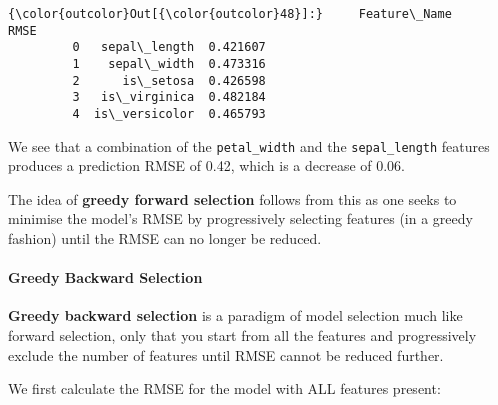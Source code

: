 \documentclass[11pt]{article}
\begin{document}
\begin{Verbatim}[commandchars=\\\{\}]
{\color{outcolor}Out[{\color{outcolor}48}]:}     Feature\_Name      RMSE
         0   sepal\_length  0.421607
         1    sepal\_width  0.473316
         2      is\_setosa  0.426598
         3   is\_virginica  0.482184
         4  is\_versicolor  0.465793
\end{Verbatim}
            
    We see that a combination of the \texttt{petal\_width} and the
\texttt{sepal\_length} features produces a prediction RMSE of 0.42,
which is a decrease of 0.06.

    The idea of \textbf{greedy forward selection} follows from this as one
seeks to minimise the model's RMSE by progressively selecting features
(in a greedy fashion) until the RMSE can no longer be reduced.

    \hypertarget{greedy-backward-selection}{%
\paragraph{Greedy Backward Selection}\label{greedy-backward-selection}}

    \textbf{Greedy backward selection} is a paradigm of model selection much
like forward selection, only that you start from all the features and
progressively exclude the number of features until RMSE cannot be
reduced further.

    We first calculate the RMSE for the model with ALL features present:
\end{document}
